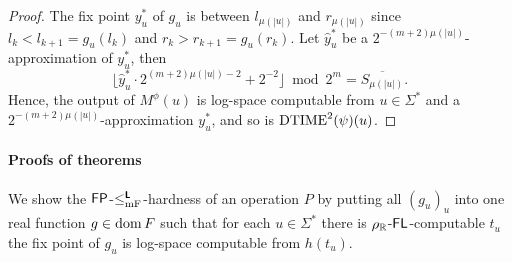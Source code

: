 \documentclass{article}
\theoremstyle{definition}
\theoremstyle{remark}
\begin{document}
\begin{proof}
 The fix point $y^*_u$ of $g_u$ is between $l_{\mu(|u|)}$ and $r_{\mu(|u|)}$ 
 since $l_k < l_{k+1} = g_u(l_k)$ and $r_k > r_{k+1} = g_u(r_k)$.
 Let $\hat y^*_u$ be a $2^{-(m+2)\mu(|u|)}$-approximation of $y^*_u$, then
\begin{equation}
 \lfloor \hat y^*_u \cdot 2^{(m+2)\mu(|u|)-2} + 2^{-2}\rfloor  \bmod 2^m
  =
  \overline{S_{\mu(|u|)}}.
\end{equation}
 Hence, the output of $M^\phi(u)$ is log-space computable from 
 $u \in \Sigma^*$ and a $2^{-(m+2)\mu(|u|)}$-approximation $y^*_u$, and so is
 $\mathrm{DTIME}^2(\psi)(u)$.
\end{proof}



\paragraph{Proofs of theorems}
\label{section:proofs-of-theorems}

We show the $\mathsf{FP}$-$\leq _{\mathrm{mF}} ^{\text{\bfseries \sffamily \upshape L}}$-hardness of an operation $P$
by putting all $(g_u)_u$ into one real function $g \in \mathop{\rm dom} F$
such that for each $u \in \Sigma^*$ there is $\rho _\mathbb R$-$\mathsf{FL}$-computable
$t_u$ the fix point of $g_u$ is log-space computable from $h(t_u)$.
\end{document}
